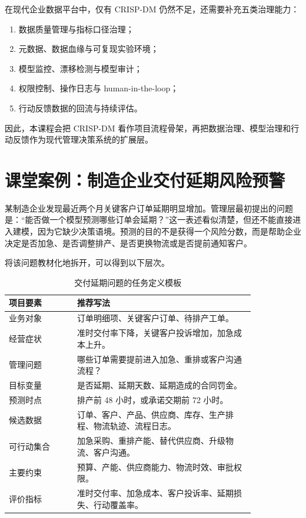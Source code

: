 \documentclass[UTF8,fontset=fandol,openany,zihao=-4]{ctexbook}
\begin{document}
在现代企业数据平台中，仅有 CRISP-DM 仍然不足，还需要补充五类治理能力：
\begin{enumerate}
  \item 数据质量管理与指标口径治理；
  \item 元数据、数据血缘与可复现实验环境；
  \item 模型监控、漂移检测与模型审计；
  \item 权限控制、操作日志与 human-in-the-loop；
  \item 行动反馈数据的回流与持续评估。
\end{enumerate}

因此，本课程会把 CRISP-DM 看作项目流程骨架，再把数据治理、模型治理和行动反馈作为现代管理决策系统的扩展层。

\section{课堂案例：制造企业交付延期风险预警}

某制造企业发现最近两个月关键客户订单延期明显增加。管理层最初提出的问题是：“能否做一个模型预测哪些订单会延期？”这一表述看似清楚，但还不能直接进入建模，因为它缺少决策语境。预测的目的不是获得一个风险分数，而是帮助企业决定是否加急、是否调整排产、是否更换物流或是否提前通知客户。

将该问题教材化地拆开，可以得到以下层次。

\begin{table}[htbp]
\centering
\caption{交付延期问题的任务定义模板}
\begin{tabular}{p{0.23\linewidth}p{0.60\linewidth}}
\toprule
项目要素 & 推荐写法\\
\midrule
业务对象 & 订单明细项、关键客户订单、待排产工单。\\
经营症状 & 准时交付率下降，关键客户投诉增加，加急成本上升。\\
管理问题 & 哪些订单需要提前进入加急、重排或客户沟通流程？\\
目标变量 & 是否延期、延期天数、延期造成的合同罚金。\\
预测时点 & 排产前 48 小时，或承诺交期前 72 小时。\\
候选数据 & 订单、客户、产品、供应商、库存、生产排程、物流轨迹、流程日志。\\
可行动集合 & 加急采购、重排产能、替代供应商、升级物流、客户沟通。\\
主要约束 & 预算、产能、供应商能力、物流时效、审批权限。\\
评价指标 & 准时交付率、加急成本、客户投诉率、延期损失、行动覆盖率。\\
\bottomrule
\end{tabular}
\end{table}
\end{document}
